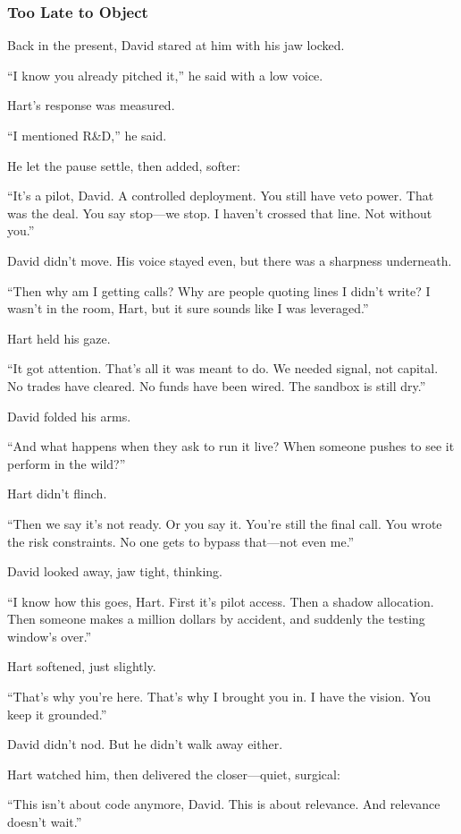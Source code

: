 \medskip

\subsubsection{Too Late to Object}

Back in the present, David stared at him with his jaw locked.

``I know you already pitched it,'' he said with a low voice.

Hart’s response was measured.

``I mentioned R\&D,'' he said.

He let the pause settle, then added, softer:

  ``It’s a pilot, David. A controlled deployment.  
  You still have veto power. That was the deal.  
  You say stop—we stop.  
  I haven’t crossed that line. Not without you.''

David didn’t move. His voice stayed even, but there was a sharpness underneath.

  ``Then why am I getting calls?  
  Why are people quoting lines I didn’t write?  
  I wasn’t in the room, Hart, but it sure sounds like I was leveraged.''

Hart held his gaze.

  ``It got attention. That’s all it was meant to do.  
  We needed signal, not capital.  
  No trades have cleared.  
  No funds have been wired.  
  The sandbox is still dry.''

David folded his arms.

  ``And what happens when they ask to run it live?  
  When someone pushes to see it perform in the wild?''

Hart didn’t flinch.

  ``Then we say it’s not ready.  
  Or you say it.  
  You’re still the final call.  
  You wrote the risk constraints.  
  No one gets to bypass that—not even me.''

David looked away, jaw tight, thinking.

  ``I know how this goes, Hart.  
  First it’s pilot access. Then a shadow allocation.  
  Then someone makes a million dollars by accident,  
  and suddenly the testing window’s over.''

Hart softened, just slightly.

  ``That’s why you’re here.  
  That’s why I brought you in.  
  I have the vision. You keep it grounded.''  

David didn’t nod. But he didn’t walk away either.

Hart watched him, then delivered the closer—quiet, surgical:

  ``This isn’t about code anymore, David.  
  This is about relevance.  
  And relevance doesn’t wait.''


